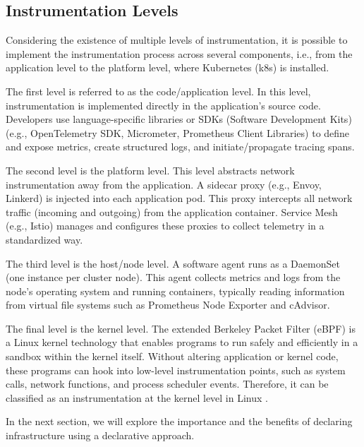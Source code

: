 \subsection{Instrumentation Levels}
\label{subsec:instrumentation-levels}

Considering the existence of multiple levels of instrumentation, it is possible to implement the instrumentation process across several components, i.e., from the application level to the platform level, where Kubernetes (k8s) is installed.

The first level is referred to as the code/application level. In this level, instrumentation is implemented directly in the application's source code. Developers use language-specific libraries or SDKs (Software Development Kits) (e.g., OpenTelemetry SDK, Micrometer, Prometheus Client Libraries) to define and expose metrics, create structured logs, and initiate/propagate tracing spans.

The second level is the platform level. This level abstracts network instrumentation away from the application. A sidecar proxy (e.g., Envoy, Linkerd) is injected into each application pod. This proxy intercepts all network traffic (incoming and outgoing) from the application container. Service Mesh (e.g., Istio) manages and configures these proxies to collect telemetry in a standardized way.

The third level is the host/node level. A software agent runs as a DaemonSet (one instance per cluster node). This agent collects metrics and logs from the node's operating system and running containers, typically reading information from virtual file systems such as Prometheus Node Exporter and cAdvisor.

The final level is the kernel level. The extended Berkeley Packet Filter (eBPF) is a Linux kernel technology that enables programs to run safely and efficiently in a sandbox within the kernel itself. Without altering application or kernel code, these programs can hook into low-level instrumentation points, such as system calls, network functions, and process scheduler events. Therefore, it can be classified as an instrumentation at the kernel level in Linux \cite{rise_2023}.

In the next section, we will explore the importance and the benefits of declaring infrastructure using a declarative approach.